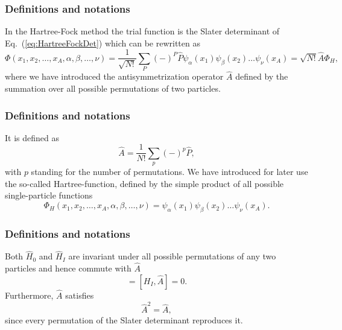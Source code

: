 \documentclass{beamer}
\begin{document}
\begin{frame}
\frametitle{Definitions and notations}

\begin{block}{}
In the Hartree-Fock method the trial function is the Slater
determinant of Eq.~(\ref{eq:HartreeFockDet}) which can be rewritten as 
\[
  \Phi(x_1,x_2,\dots,x_A,\alpha,\beta,\dots,\nu) = \frac{1}{\sqrt{N!}}\sum_{P} (-)^P\hat{P}\psi_{\alpha}(x_1)
    \psi_{\beta}(x_2)\dots\psi_{\nu}(x_A)=\sqrt{N!}\hat{A}\Phi_H,
\]
where we have introduced the antisymmetrization operator $\hat{A}$ defined by the 
summation over all possible permutations of two particles.
\end{block}
\end{frame}

\begin{frame}
\frametitle{Definitions and notations}

\begin{block}{}
It is defined as
\begin{equation}
  \hat{A} = \frac{1}{N!}\sum_{p} (-)^p\hat{P},
\label{antiSymmetryOperator}
\end{equation}
with $p$ standing for the number of permutations. We have introduced for later use the so-called
Hartree-function, defined by the simple product of all possible single-particle functions
\[
  \Phi_H(x_1,x_2,\dots,x_A,\alpha,\beta,\dots,\nu) =
  \psi_{\alpha}(x_1)
    \psi_{\beta}(x_2)\dots\psi_{\nu}(x_A).
\]
\end{block}
\end{frame}

\begin{frame}
\frametitle{Definitions and notations}

\begin{block}{}
Both $\hat{H}_0$ and $\hat{H}_I$ are invariant under all possible permutations of any two particles
and hence commute with $\hat{A}$
\begin{equation}
  [H_0,\hat{A}] = [H_I,\hat{A}] = 0. \label{commutionAntiSym}
\end{equation}
Furthermore, $\hat{A}$ satisfies
\begin{equation}
  \hat{A}^2 = \hat{A},  \label{AntiSymSquared}
\end{equation}
since every permutation of the Slater
determinant reproduces it. 
\end{block}
\end{frame}
\end{document}
